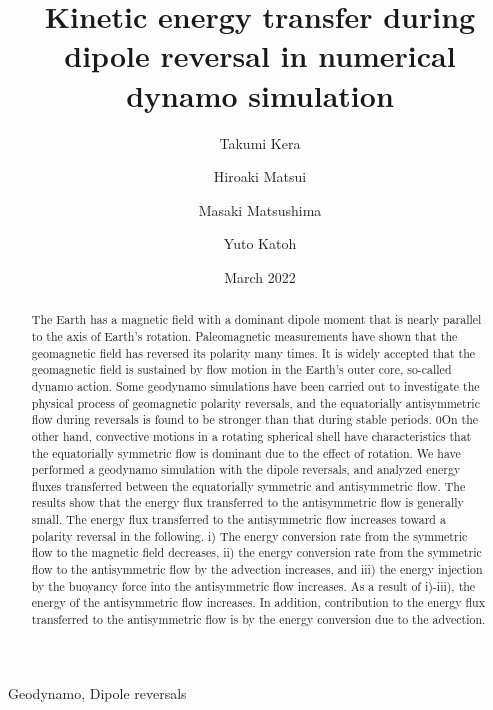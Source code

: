 \documentclass[review]{elsarticle}
\date{March 2022}
\begin{document}
\title{Kinetic energy transfer during dipole reversal in numerical dynamo simulation}

\author[Tohoku]{Takumi Kera}
\author[ucd]{Hiroaki Matsui}
\author[TITECH]{Masaki Matsushima}
\author[Tohoku]{Yuto Katoh}

\address[Tohoku]{Department of Geophysics, Tohoku University, Sendai, Japan.}
\address[ucd]{Department of the Earth and Planetary Sciences, University of California, Davis, CA, USA.}
\address[TITECH]{Department of Earth and Planetary Sciences, Tokyo Institute of Technology, Tokyo, Japan.}

\begin{keyword}
Geodynamo, Dipole reversals
\end{keyword}

\begin{abstract}
The Earth has a magnetic field with a dominant dipole moment that is nearly parallel to the axis of Earth’s rotation. Paleomagnetic measurements have shown that the geomagnetic field has reversed its polarity many times. It is widely accepted that the geomagnetic field is sustained by flow motion in the Earth’s outer core, so-called dynamo action. Some geodynamo simulations have been carried out to investigate the physical process of geomagnetic polarity reversals, and the equatorially antisymmetric flow during reversals is found to be stronger than that during stable periods. 0On the other hand, convective motions in a rotating spherical shell have characteristics that the equatorially symmetric flow is dominant due to the effect of rotation. We have performed a geodynamo simulation with the dipole reversals, and  analyzed energy fluxes transferred between the equatorially symmetric and antisymmetric flow. The results show that the energy flux transferred to the antisymmetric flow is generally small. The energy flux transferred to the antisymmetric flow increases toward a polarity reversal in the following. i) The energy conversion rate from the symmetric flow to the magnetic field decreases, ii) the energy conversion rate from the symmetric flow to the antisymmetric flow by the advection increases, and iii) the energy injection by the buoyancy force into the antisymmetric flow increases. As a result of i)-iii), the energy of the antisymmetric flow increases. In addition, contribution to the energy flux transferred to the antisymmetric flow is by the energy conversion due to the advection.
\end{abstract}

\maketitle












%

\end{document}
